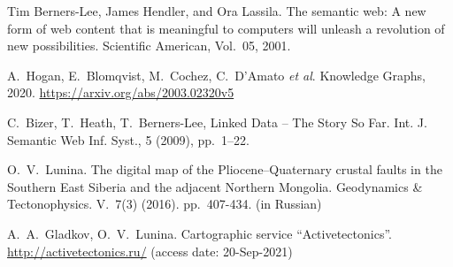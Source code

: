 \documentclass[
]{ceurart}
\begin{document}
\begin{thebibliography}{99}


 Tim Berners-Lee, James Hendler, and Ora Lassila.  The semantic web: A new form of web content that is meaningful to computers will unleash a revolution of new possibilities.  Scientific American, Vol.~05, 2001.

 A.~Hogan, E.~Blomqvist, M.~Cochez, C.~D’Amato \emph{et al}. Knowledge Graphs, 2020. \url{https://arxiv.org/abs/2003.02320v5}

 C.~Bizer, T.~Heath, T.~Berners-Lee, Linked Data -- The Story So Far.  Int. J. Semantic Web Inf. Syst., 5 (2009), pp.~1--22. 

 O.~V.~Lunina.  The digital map of the Pliocene–Quaternary crustal faults in the Southern East Siberia and the adjacent Northern Mongolia.  Geodynamics \& Tectonophysics.  V.~7(3) (2016).  pp.~407-434. (in Russian) 

 A.~A.~Gladkov, O.~V.~Lunina. Cartographic service ``Activetectonics''. \url{http://activetectonics.ru/} (access date: 20-Sep-2021)








\end{thebibliography}
\end{document}
